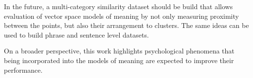 \documentclass[11pt]{article}
\begin{document}
In the future, a multi-category similarity dataset should be build that allows evaluation of vector space models of meaning by not only measuring proximity between the points, but also their arrangement to clusters. The same ideas can be used to build phrase and sentence level datasets.


On a broader perspective, this work highlights psychological phenomena that being incorporated into the models of meaning are expected to improve their performance.

\balance


\end{document}
